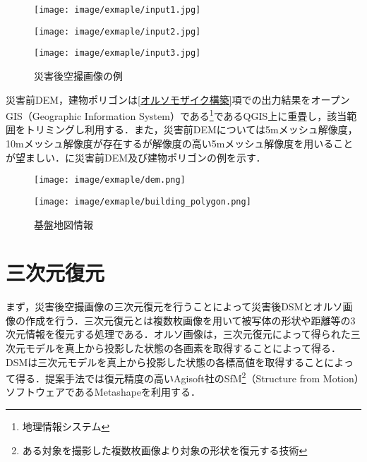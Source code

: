     \begin{figure}[t]
      \begin{minipage}[c]{0.329\hsize}
        \centering
        \texttt{[image: image/exmaple/input1.jpg]}
        \label{入力画像例1}
      \end{minipage}
      \begin{minipage}[c]{0.329\hsize}
        \centering
        \texttt{[image: image/exmaple/input2.jpg]}
        \label{入力画像例2}
      \end{minipage}
      \begin{minipage}[c]{0.329\hsize}
        \centering
        \texttt{[image: image/exmaple/input3.jpg]}
        \label{入力画像例3}
      \end{minipage}
      \caption{災害後空撮画像の例}
      \label{空撮画像例}
    \end{figure}

    災害前DEM，建物ポリゴンは\ref{オルソモザイク構築}項での出力結果をオープンGIS（Geographic Information System）である\footnote{地理情報システム}であるQGIS\cite{QGIS}上に重畳し，該当範囲をトリミングし利用する．また，災害前DEMについては5mメッシュ解像度，10mメッシュ解像度が存在するが解像度の高い5mメッシュ解像度を用いることが望ましい．に災害前DEM及び建物ポリゴンの例を示す．

    \begin{figure}[t]
      \begin{minipage}[c]{0.45\hsize}
        \centering
        \texttt{[image: image/exmaple/dem.png]}
      \end{minipage}
      \begin{minipage}[c]{0.45\hsize}
        \centering
        \texttt{[image: image/exmaple/building\_polygon.png]}
      \end{minipage}
      \caption{基盤地図情報}
      \label{基盤地図情報}
    \end{figure}


  \section{三次元復元}
    まず，災害後空撮画像の三次元復元を行うことによって災害後DSMとオルソ画像の作成を行う．三次元復元とは複数枚画像を用いて被写体の形状や距離等の3次元情報を復元する処理である．オルソ画像は，三次元復元によって得られた三次元モデルを真上から投影した状態の各画素を取得することによって得る．DSMは三次元モデルを真上から投影した状態の各標高値を取得することによって得る．提案手法では復元精度の高いAgisoft社のSfM\footnote{ある対象を撮影した複数枚画像より対象の形状を復元する技術}（Structure from Motion）ソフトウェアであるMetashape\cite{Metashape}を利用する．


